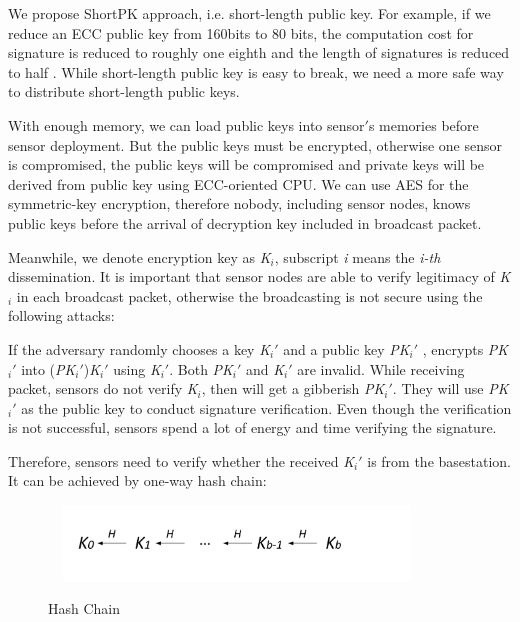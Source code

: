 \documentclass{sig-alternate-05-2015}
\begin{document}
We propose ShortPK approach, i.e. short-length public key. For example, if we reduce an ECC public key from 160bits to 80 bits, the computation cost for signature is reduced to roughly one eighth and the length of signatures is reduced to half \cite{ShortPK}. While short-length public key is easy to break, we need a more safe way to distribute short-length public keys. 

With enough memory, we can load public keys into sensor$'$s memories before sensor deployment. But the public keys must be encrypted, otherwise one sensor is compromised, the public keys will be compromised and private keys will be derived from public key using ECC-oriented CPU.  We can use AES for the symmetric-key encryption, therefore nobody, including sensor nodes, knows public keys before the arrival of decryption key included in broadcast packet. 

Meanwhile, we denote encryption key as \emph{K$_i$}, subscript \emph{i} means the \emph{i-th} dissemination. It is important that sensor nodes are able to verify legitimacy of \emph{K$_i$} in each broadcast packet, otherwise the broadcasting is not secure using the following attacks:

If the adversary randomly chooses a key \emph{K$_i '$} and a public key \emph{PK$_i '$} , encrypts \emph{PK$_i '$} into (\emph{PK$_i '$})\emph{K$_i '$} using \emph{K$_i '$}. Both \emph{PK$_i '$} and \emph{K$_i '$} are invalid. While receiving packet, sensors do not verify \emph{K$_i$}, then will get a gibberish \emph{PK$_i '$}. They will use \emph{PK$_i '$} as the public key to conduct signature verification. Even though the verification is not successful, sensors spend a lot of energy and time verifying the signature.

Therefore, sensors need to verify whether the received \emph{K$_i '$} is from the basestation. It can be achieved by one-way hash chain: 

\begin{figure}
\centering
\includegraphics[width=10cm,height=2cm]{HashChain.pdf}\\
\caption{Hash Chain}\label{} 
\end{figure}
\end{document}
